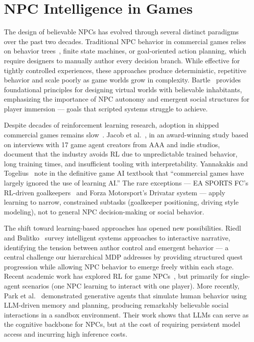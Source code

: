 \documentclass[12pt, a4paper, oneside]{report}
\begin{document}
\section{NPC Intelligence in Games}
\label{sec:npc-intelligence}

The design of believable NPCs has evolved through several distinct paradigms over the past two decades. Traditional NPC behavior in commercial games relies on behavior trees~\cite{isla2005bt}, finite state machines, or goal-oriented action planning, which require designers to manually author every decision branch. While effective for tightly controlled experiences, these approaches produce deterministic, repetitive behavior and scale poorly as game worlds grow in complexity. Bartle~\cite{bartle2004worlds} provides foundational principles for designing virtual worlds with believable inhabitants, emphasizing the importance of NPC autonomy and emergent social structures for player immersion --- goals that scripted systems struggle to achieve.

Despite decades of reinforcement learning research, adoption in shipped commercial games remains slow~\cite{liu2025schola}. Jacob et al.~\cite{jacob2020unwieldy}, in an award-winning study based on interviews with 17 game agent creators from AAA and indie studios, document that the industry avoids RL due to unpredictable trained behavior, long training times, and insufficient tooling with interpretability. Yannakakis and Togelius~\cite{yannakakis2018gameai} note in the definitive game AI textbook that ``commercial games have largely ignored the use of learning AI.'' The rare exceptions --- EA SPORTS FC's RL-driven goalkeepers~\cite{liu2025schola} and Forza Motorsport's Drivatar system --- apply learning to narrow, constrained subtasks (goalkeeper positioning, driving style modeling), not to general NPC decision-making or social behavior.

The shift toward learning-based approaches has opened new possibilities. Riedl and Bulitko~\cite{riedl2013interactive} survey intelligent systems approaches to interactive narrative, identifying the tension between author control and emergent behavior --- a central challenge our hierarchical MDP addresses by providing structured quest progression while allowing NPC behavior to emerge freely within each stage. Recent academic work has explored RL for game NPCs~\cite{riedl2012interactive}, but primarily for single-agent scenarios (one NPC learning to interact with one player). More recently, Park et al.~\cite{park2023generative} demonstrated generative agents that simulate human behavior using LLM-driven memory and planning, producing remarkably believable social interactions in a sandbox environment. Their work shows that LLMs can serve as the cognitive backbone for NPCs, but at the cost of requiring persistent model access and incurring high inference costs.
\end{document}
